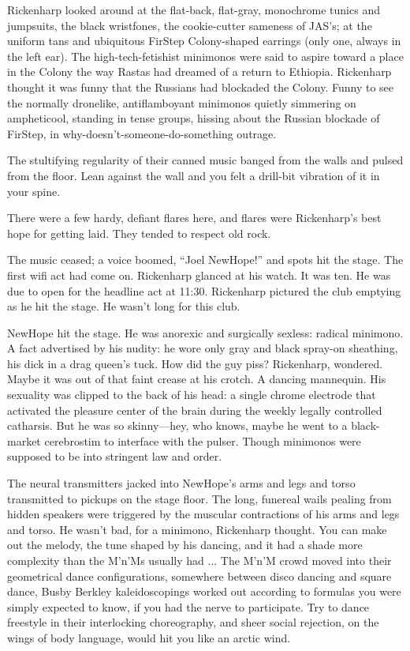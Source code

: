 Rickenharp looked around at the flat-back, flat-gray, monochrome tunics and jumpsuits, the black wristfones, the cookie-cutter sameness of JAS's; at the uniform tans and ubiquitous FirStep Colony-shaped earrings (only one, always in the left ear). The high-tech-fetishist minimonos were said to aspire toward a place in the Colony the way Rastas had dreamed of a return to Ethiopia. Rickenharp thought it was funny that the Russians had blockaded the Colony. Funny to see the normally dronelike, antiflamboyant minimonos quietly simmering on ampheticool, standing in tense groups, hissing about the Russian blockade of FirStep, in why-doesn't-someone-do-something outrage.

The stultifying regularity of their canned music banged from the walls and pulsed from the floor. Lean against the wall and you felt a drill-bit vibration of it in your spine.

There were a few hardy, defiant flares here, and flares were Rickenharp's best hope for getting laid. They tended to respect old rock.

The music ceased; a voice boomed, ``Joel NewHope!'' and spots hit the stage. The first wifi act had come on. Rickenharp glanced at his watch. It was ten. He was due to open for the headline act at 11:30. Rickenharp pictured the club emptying as he hit the stage. He wasn't long for this club.

NewHope hit the stage. He was anorexic and surgically sexless: radical minimono. A fact advertised by his nudity: he wore only gray and black spray-on sheathing, his dick in a drag queen's tuck. How did the guy piss? Rickenharp, wondered. Maybe it was out of that faint crease at his crotch. A dancing mannequin. His sexuality was clipped to the back of his head: a single chrome electrode that activated the pleasure center of the brain during the weekly legally controlled catharsis. But he was so skinny—hey, who knows, maybe he went to a black-market cerebrostim to interface with the pulser. Though minimonos were supposed to be into stringent law and order.

The neural transmitters jacked into NewHope's arms and legs and torso transmitted to pickups on the stage floor. The long, funereal wails pealing from hidden speakers were triggered by the muscular contractions of his arms and legs and torso. He wasn't bad, for a minimono, Rickenharp thought. You can make out the melody, the tune shaped by his dancing, and it had a shade more complexity than the M'n'Ms usually had ... The M'n'M crowd moved into their geometrical dance configurations, somewhere between disco dancing and square dance, Busby Berkley kaleidoscopings worked out according to formulas you were simply expected to know, if you had the nerve to participate. Try to dance freestyle in their interlocking choreography, and sheer social rejection, on the wings of body language, would hit you like an arctic wind.

